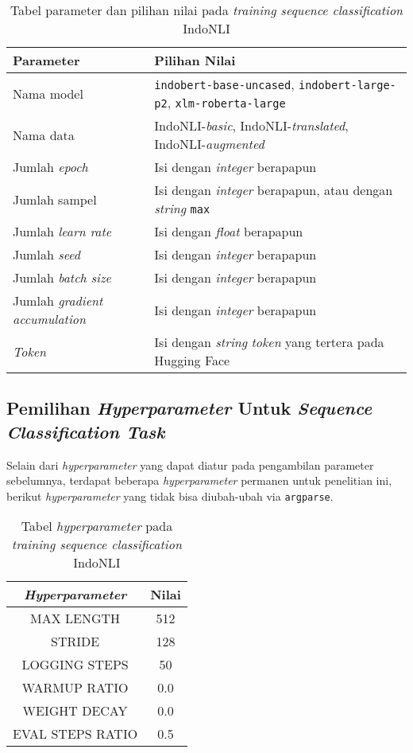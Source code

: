 \begin{table}[h!]
\centering
\begin{tabular}{|P{2.0in}|P{4.0in}|}
 \hline
 Parameter & Pilihan Nilai \\ [0.5ex] 
 \hline
 Nama model & \texttt{indobert-base-uncased}, \texttt{indobert-large-p2}, \texttt{xlm-roberta-large} \\ 
 Nama data & IndoNLI-\emph{basic}, IndoNLI-\emph{translated}, IndoNLI-\emph{augmented} \\
 Jumlah \emph{epoch} & Isi dengan \emph{integer} berapapun \\
 Jumlah sampel & Isi dengan \emph{integer} berapapun, atau dengan \emph{string} \texttt{max} \\
 Jumlah \emph{learn rate} & Isi dengan \emph{float} berapapun \\ 
 Jumlah \emph{seed} & Isi dengan \emph{integer} berapapun \\ 
 Jumlah \emph{batch size} & Isi dengan \emph{integer} berapapun \\ 
 Jumlah \emph{gradient accumulation} & Isi dengan \emph{integer} berapapun \\ 
 \emph{Token} & Isi dengan \emph{string} \emph{token} yang tertera pada Hugging Face \\[1ex] 
 \hline
\end{tabular}
\caption{Tabel parameter dan pilihan nilai pada \emph{training sequence classification} IndoNLI}
\end{table}

\subsection{Pemilihan \emph{Hyperparameter} Untuk \emph{Sequence Classification Task}}
Selain dari \emph{hyperparameter} yang dapat diatur pada pengambilan parameter sebelumnya, terdapat beberapa \emph{hyperparameter} permanen untuk penelitian ini, berikut \emph{hyperparameter} yang tidak bisa diubah-ubah via \texttt{argparse}.

\begin{table}[h]
\centering
\begin{tabular}{||c | c||} 
 \hline\hline
 \emph{Hyperparameter} & Nilai \\ [0.5ex] 
 \hline\hline
 MAX LENGTH & 512 \\ 
 STRIDE & 128 \\
 LOGGING STEPS & 50 \\
 WARMUP RATIO & 0.0 \\
 WEIGHT DECAY & 0.0 \\ 
 EVAL STEPS RATIO & 0.5 \\ [1ex] 
 \hline\hline
\end{tabular}
\caption{Tabel \emph{hyperparameter} pada \emph{training sequence classification} IndoNLI}
\end{table}

